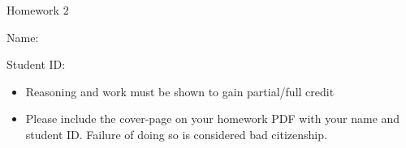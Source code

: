 \documentclass[11pt]{exam}
\begin{document}
\centerline{\Large \sc Homework 2}
\pagestyle{empty}

\hrulefill

\vspace{2cm}


{\Large \sc Name:}



\vspace{2cm}



{\Large \sc Student ID:}

\vspace{6cm}

\begin{itemize}
  \item Reasoning and work must be shown to gain partial/full
  credit
  \item Please include the cover-page on your homework PDF with your name and student ID. Failure of doing so is considered bad citizenship. 

 \end{itemize}
\end{document}
